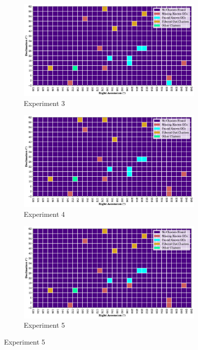 \begin{figure}[H]
    \begin{subfigure}[b]{0.49\textwidth}
        \includegraphics[width=\textwidth]{./figures/rasters/grids/grid-run-03-a1.pdf}
        \caption{Experiment 3}
    \end{subfigure}
    \begin{subfigure}[b]{0.49\textwidth}
        \includegraphics[width=\textwidth]{./figures/rasters/grids/grid-run-04-a1.pdf}
        \caption{Experiment 4}
    \end{subfigure}

    \begin{subfigure}[b]{0.5\textwidth}
        \includegraphics[width=\textwidth]{./figures/rasters/grids/grid-run-05-a1.pdf}
        \caption{Experiment 5}
    \end{subfigure}
\end{figure}

